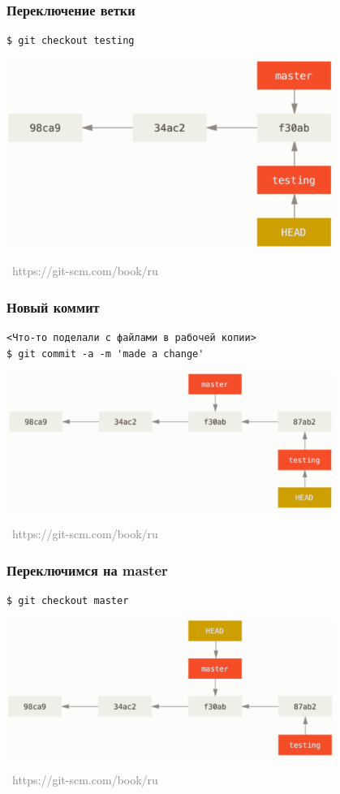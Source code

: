 \documentclass[xetex,mathserif,serif]{beamer}
\newcommand{\attribution}[1] {
	\vspace{-5mm}\begin{flushright}\begin{scriptsize}\textcolor{gray}{\textcopyright\, #1}\end{scriptsize}\end{flushright}
}
\begin{document}
	\begin{frame}[fragile]
		\frametitle{Переключение ветки}
		\begin{verbatim}
$ git checkout testing
		\end{verbatim}
		\begin{center}
			\includegraphics[width=0.8\textwidth]{checkout.png}
			\attribution{https://git-scm.com/book/ru}
		\end{center}
	\end{frame}

	\begin{frame}[fragile]
		\frametitle{Новый коммит}
		\begin{verbatim}
<Что-то поделали с файлами в рабочей копии>
$ git commit -a -m 'made a change'
		\end{verbatim}
		\begin{center}
			\includegraphics[width=0.8\textwidth]{newCommit.png}
			\attribution{https://git-scm.com/book/ru}
		\end{center}
	\end{frame}

	\begin{frame}[fragile]
		\frametitle{Переключимся на master}
		\begin{verbatim}
$ git checkout master
		\end{verbatim}
		\begin{center}
			\includegraphics[width=0.8\textwidth]{checkoutToMaster.png}
			\attribution{https://git-scm.com/book/ru}
		\end{center}
	\end{frame}
\end{document}
